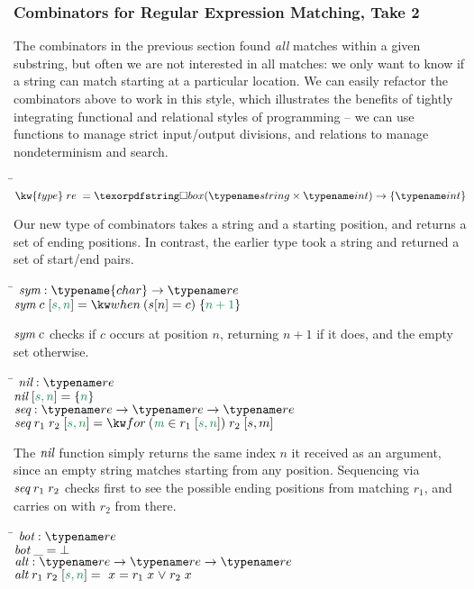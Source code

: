 \subsubsection{Combinators for Regular Expression Matching, Take 2}

The combinators in the previous section found \emph{all} matches
within a given substring, but often we are not interested in all
matches: we only want to know if a string can match starting at a
particular location. We can easily refactor the combinators above to
work in this style, which illustrates the benefits of tightly
integrating functional and relational styles of programming -- we can
use functions to manage strict input/output divisions, and relations
to manage nondeterminism and search.
%
\begin{tabbing}
\qquad \=  $\kw{type}\;re\;=\iso (\tstring \times \tint) \to \tset{\tint}$ \+
\end{tabbing}
%
Our new type of combinators takes a string and a starting
position, and returns a set of ending positions. In contrast, the earlier type
took a string and returned a set of start/end pairs.
%
\begin{tabbing}
\qquad \=  $\name{sym} : \typename{char} \to \tre$\+ \\
  $\name{sym}\;c\;\ebox{s,n} = \ewhen{s[n] = c}{\eset{n+1}}$
\end{tabbing}
%
$\text{\itshape sym}\;c$ checks if $c$ occurs at position
$n$, returning $n+1$ if it does, and the empty
set otherwise.
%
\begin{tabbing}
\qquad \=  $\name{nil} : \tre$\+ \\
  $\name{nil}\;\ebox{s, n} = \eset{n}$ \\[1em]

  $\name{seq} : \tre \to \tre \to \tre$ \\
  $\name{seq}\;r_1\;r_2\;\ebox{s,n} = \efor{m}{r_1\;\ebox{s,n}}{r_2\;[s,m]}$
\end{tabbing}
%
The $\text{\itshape nil}$ function simply returns the same index $n$ it received as an
argument, since an empty string matches starting from any position. Sequencing
via $\text{\itshape seq}\;r_1\;r_2$ checks first to see the possible ending positions from
matching $r_1$, and carries on with $r_2$ from there.
%
\begin{tabbing}
  \qquad \=
  $\name{bot} : \tre$ \+\\
  $\text{\itshape bot}\;\_ = \bot$ \\[1em]

  $\name{alt} : \tre \to \tre \to \tre$ \\
  $\name{alt}\;r_1\;r_2\;\ebox{s,n} =\ x = r_1\;x \vee r_2\;x$
\end{tabbing}
